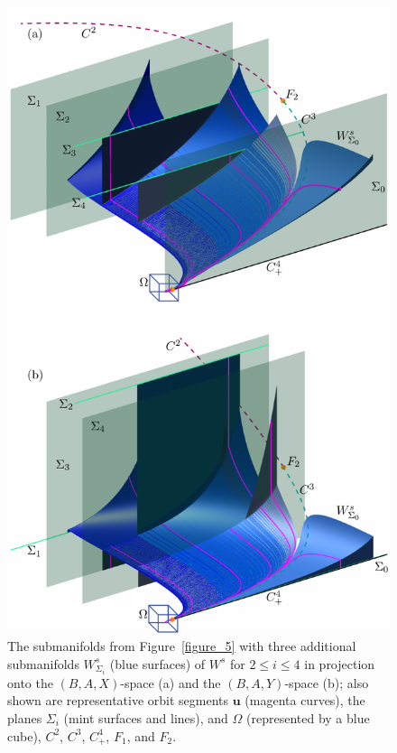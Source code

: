 \documentclass{ws-ijbc}
\begin{document}
\begin{figure}[t!]
\centering
\includegraphics[]{./figures/MKMO_6.pdf}
\caption{The submanifolds from Figure~\ref{figure_5} with three additional submanifolds $W^s_{\Sigma_i}$ (blue surfaces) of $W^s$ for $2 \leq i \leq 4$ in projection onto the $(B,A,X)$-space (a) and the $(B,A,Y)$-space (b); also shown are representative orbit segments $\mathbf{u}$ (magenta curves), the planes $\Sigma_i$ (mint surfaces and lines), and $\Omega$ (represented by a blue cube), $C^2$, $C^3$, $C^4_+$, $F_1$, and $F_2$.}
\label{figure_6}
\end{figure}
\end{document}

